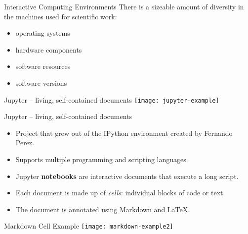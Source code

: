 \documentclass{beamer}
\begin{document}

\begin{frame}{Interactive Computing Environments}
  There is a sizeable amount of diversity in the machines used for scientific work:
  \begin{itemize}
    \item operating systems

    \item hardware components

    \item software resources

    \item software versions
  \end{itemize}
\end{frame}


\begin{frame}{Jupyter -- living, self-contained documents}
  \center
  \texttt{[image: jupyter-example]}
\end{frame}

\begin{frame}{Jupyter -- living, self-contained documents}
  \begin{itemize}
    \item Project that grew out of the IPython environment created by Fernando Perez.

    \item Supports multiple programming and scripting languages.

    \item Jupyter \textbf{notebooks} are interactive documents that execute a long script.

    \item Each document is made up of \textit{cells}: individual blocks of code or text.

    \item The document is annotated using Markdown and \LaTeX.
  \end{itemize}
\end{frame}

\begin{frame}{Markdown Cell Example}
  \center
  \texttt{[image: markdown-example2]}
\end{frame}
\end{document}
